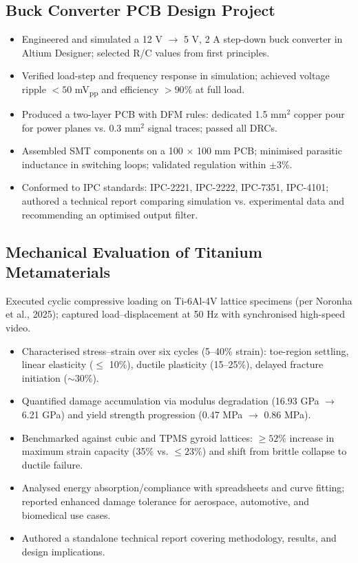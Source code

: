 \documentclass[11pt,a4paper]{article}
\begin{document}
\subsection{Buck Converter PCB Design Project}
\begin{itemize}
    \item Engineered and simulated a 12 V $\rightarrow$ 5 V, 2 A step-down buck converter in Altium Designer; selected R/C values from first principles.
    \item Verified load-step and frequency response in simulation; achieved voltage ripple $< 50$ mV\textsubscript{pp} and efficiency $> 90$\% at full load.
    \item Produced a two-layer PCB with DFM rules: dedicated 1.5 mm$^2$ copper pour for power planes vs. 0.3 mm$^2$ signal traces; passed all DRCs.
    \item Assembled SMT components on a 100 $\times$ 100 mm PCB; minimised parasitic inductance in switching loops; validated regulation within $\pm 3$\%.
    \item Conformed to IPC standards: IPC-2221, IPC-2222, IPC-7351, IPC-4101; authored a technical report comparing simulation vs. experimental data and recommending an optimised output filter.
\end{itemize}

\subsection{Mechanical Evaluation of Titanium Metamaterials}
Executed cyclic compressive loading on Ti-6Al-4V lattice specimens (per Noronha et al., 2025); captured load--displacement at 50 Hz with synchronised high-speed video.
\begin{itemize}
    \item Characterised stress--strain over six cycles (5--40\% strain): toe-region settling, linear elasticity ($\le$ 10\%), ductile plasticity (15--25\%), delayed fracture initiation ($\sim 30$\%).
    \item Quantified damage accumulation via modulus degradation (16.93 GPa $\rightarrow$ 6.21 GPa) and yield strength progression (0.47 MPa $\rightarrow$ 0.86 MPa).
    \item Benchmarked against cubic and TPMS gyroid lattices: $\ge 52$\% increase in maximum strain capacity (35\% vs. $\le 23$\%) and shift from brittle collapse to ductile failure.
    \item Analysed energy absorption/compliance with spreadsheets and curve fitting; reported enhanced damage tolerance for aerospace, automotive, and biomedical use cases.
    \item Authored a standalone technical report covering methodology, results, and design implications.
\end{itemize}
\end{document}
